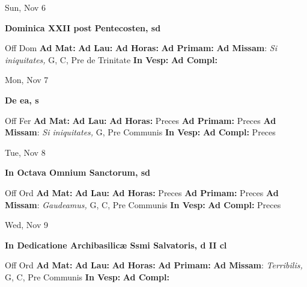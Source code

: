 \documentclass[10pt]{article}
\begin{document}
\begin{minipage}{3.5in}
\vspace{2em}\begin{center}
Sun, Nov 6
\end{center}\textbf{ \large Dominica XXII post Pentecosten, \textnormal{\normalsize sd}}
\begin{justify}
Off Dom
\textbf{Ad Mat: }
\textbf{Ad Lau: }
\textbf{Ad Horas: }
\textbf{Ad Primam: }
\textbf{Ad Missam}: \textit{Si iniquitates,} G, C, Pre de Trinitate
\textbf{In Vesp: }
\textbf{Ad Compl: }\end{justify}
\end{minipage}



\begin{minipage}{3.5in}
\vspace{2em}\begin{center}
Mon, Nov 7
\end{center}\textbf{ \large De ea, \textnormal{\normalsize s}}
\begin{justify}
Off Fer
\textbf{Ad Mat: }
\textbf{Ad Lau: }
\textbf{Ad Horas: }Preces
\textbf{Ad Primam: }Preces
\textbf{Ad Missam}: \textit{Si iniquitates,} G, Pre Communis
\textbf{In Vesp: }
\textbf{Ad Compl: }Preces\end{justify}
\end{minipage}



\begin{minipage}{3.5in}
\vspace{2em}\begin{center}
Tue, Nov 8
\end{center}\textbf{ \large In Octava Omnium Sanctorum, \textnormal{\normalsize sd}}
\begin{justify}
Off Ord
\textbf{Ad Mat: }
\textbf{Ad Lau: }
\textbf{Ad Horas: }Preces
\textbf{Ad Primam: }Preces
\textbf{Ad Missam}: \textit{Gaudeamus,} G, C, Pre Communis
\textbf{In Vesp: }
\textbf{Ad Compl: }Preces\end{justify}
\end{minipage}



\begin{minipage}{3.5in}
\vspace{2em}\begin{center}
Wed, Nov 9
\end{center}\textbf{ \large In Dedicatione Archibasilicæ Ssmi Salvatoris, \textnormal{\normalsize d II cl}}
\begin{justify}
Off Ord
\textbf{Ad Mat: }
\textbf{Ad Lau: }
\textbf{Ad Horas: }
\textbf{Ad Primam: }
\textbf{Ad Missam}: \textit{Terribilis,} G, C, Pre Communis
\textbf{In Vesp: }
\textbf{Ad Compl: }\end{justify}
\end{minipage}
\end{document}
